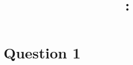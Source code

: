 \documentclass{article}
\title{
	\vspace{2in}
	\textmd{\textbf{\hmwkClass:\ \hmwkTitle}}\\
	\vspace{5in}
}
\author{\textbf{\hmwkAuthorName}}
\date{}
\begin{document}
	
	\maketitle
	
	\pagebreak
	
	\section{Question 1}

	
\end{document}
